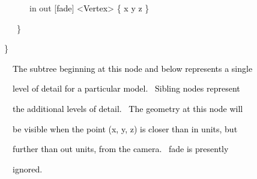 \documentclass[a4paper]{article}
\newcommand\textstyleOOoComputerKeyWord[1]{\textrm{\textcolor[rgb]{0.0,0.0,0.5019608}{#1}}}
\newcommand\textstyleOOoAssemblerSpecialChar[1]{\textrm{\textcolor[rgb]{0.0,0.5019608,0.0}{#1}}}
\newcommand\textstyleOOoAssemblerIdent[1]{\textrm{\textcolor{black}{#1}}}
\newcommand\textstyleOOoAssemblerInstruction[1]{\textrm{\textcolor[rgb]{0.0,0.0,0.49803922}{#1}}}
\begin{document}
{\color{black}
\textstyleOOoComputerKeyWord{\textcolor{black}{\ \ \ \ \ \ \ \ }}\textstyleOOoAssemblerInstruction{in}\textstyleOOoComputerKeyWord{\textcolor{black}{
}}\textstyleOOoAssemblerInstruction{out}\textstyleOOoComputerKeyWord{\textcolor{black}{
}}\textstyleOOoAssemblerSpecialChar{[}\textstyleOOoAssemblerIdent{fade}\textstyleOOoAssemblerSpecialChar{]}\textstyleOOoComputerKeyWord{\textcolor{black}{
}}\textstyleOOoAssemblerSpecialChar{{\textless}}\textstyleOOoAssemblerIdent{Vertex}\textstyleOOoAssemblerSpecialChar{{\textgreater}}\textstyleOOoComputerKeyWord{\textcolor{black}{
}}\textstyleOOoAssemblerSpecialChar{\{}\textstyleOOoComputerKeyWord{\textcolor{black}{
}}\textstyleOOoAssemblerIdent{x}\textstyleOOoComputerKeyWord{\textcolor{black}{
}}\textstyleOOoAssemblerIdent{y}\textstyleOOoComputerKeyWord{\textcolor{black}{
}}\textstyleOOoAssemblerIdent{z}\textstyleOOoComputerKeyWord{\textcolor{black}{
}}\textstyleOOoAssemblerSpecialChar{\}}}

{\color{black}
\textstyleOOoComputerKeyWord{\textcolor{black}{\ \ \ \ \ }}\textstyleOOoAssemblerSpecialChar{\}}}

{\color{black}
\textstyleOOoComputerKeyWord{\textcolor{black}{\ \ }}\textstyleOOoAssemblerSpecialChar{\}}}


\bigskip

{\color{black}
\textstyleOOoComputerKeyWord{\textcolor{black}{\ \ \ \ The subtree beginning at this node and below represents a
single}}}

{\color{black}
\textstyleOOoComputerKeyWord{\textcolor{black}{\ \ \ \ level of detail for a particular model. \ Sibling nodes
represent}}}

{\color{black}
\textstyleOOoComputerKeyWord{\textcolor{black}{\ \ \ \ the additional levels of detail. \ The geometry at this node
will}}}

{\color{black}
\textstyleOOoComputerKeyWord{\textcolor{black}{\ \ \ \ be visible when the point (x, y, z) is closer than
{\textquotedbl}in{\textquotedbl} units, but}}}

{\color{black}
\textstyleOOoComputerKeyWord{\textcolor{black}{\ \ \ \ further than {\textquotedbl}out{\textquotedbl} units, from the
camera. \ {\textquotedbl}fade{\textquotedbl} is presently}}}

{\color{black}
\textstyleOOoComputerKeyWord{\textcolor{black}{\ \ \ \ ignored.}}}


\bigskip

\clearpage
\bigskip


\bigskip
\end{document}
